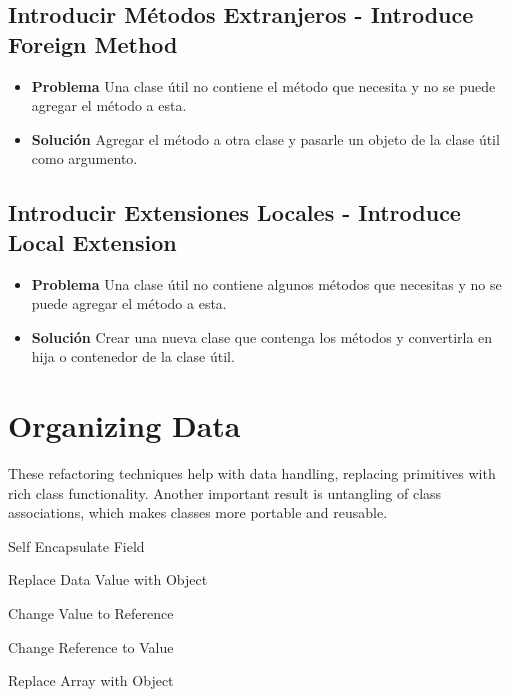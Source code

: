 \documentclass[11pt,a4paper,oneside]{book}
\begin{document}
 \subsection{Introducir Métodos Extranjeros - Introduce Foreign Method}  
 \begin{itemize}
    \item \textbf{Problema}  Una clase útil no contiene el método que necesita y no se puede agregar el método a esta.
    
    
    
    \item \textbf{Solución} Agregar el método a otra clase y pasarle un objeto de la clase útil como argumento.
    
    
\end{itemize}

\subsection{Introducir Extensiones Locales - Introduce Local Extension}  
    \begin{itemize}
    \item \textbf{Problema} Una clase útil no contiene algunos métodos que necesitas y no se puede agregar el método a esta.
    \item \textbf{Solución} Crear una nueva clase que contenga los métodos y convertirla en hija o contenedor de la clase útil.
\end{itemize}



\section{Organizing Data}

These refactoring techniques help with data handling, replacing primitives with rich class functionality. Another important result is untangling of class associations, which makes classes more portable and reusable.

    Self Encapsulate Field
    
    Replace Data Value with Object
    
    Change Value to Reference
    
    Change Reference to Value
    
    Replace Array with Object
    
\end{document}
